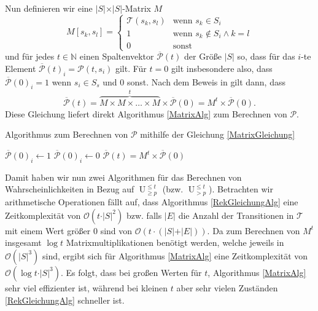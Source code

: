 \documentclass{lni}
\theoremstyle{def_style}
\theoremstyle{break}
\newcommand{\UEqual}[4]{#1\operatorname{U}^{\leq #2}_{\geq #3}#4}
\newcommand{\UStrict}[4]{#1\operatorname{U}^{\leq #2}_{> #3}#4}
\begin{document}
Nun definieren wir eine $\vert S \vert \times \vert S \vert$-Matrix $M$
$$M[s_k,s_l] = \begin{cases}
	\mathcal{T}(s_k,s_l) & \text{wenn } s_k\in S_i \\
	1 & \text{wenn } s_k\notin S_i \land k=l \\
	0 & \text{sonst}
\end{cases}$$
und für jedes $t\in \mathbb{N}$ einen Spaltenvektor $\overline{\mathcal{P}}(t)$ der Größe $\vert S \vert$ so, dass für das $i$-te Element $\overline{\mathcal{P}}(t)_i=\mathcal{P}(t,s_i)$ gilt. 
Für $t=0$ gilt insbesondere also, dass $\overline{\mathcal{P}}(0)_i=1$ wenn $s_i\in S_s$ und $0$ sonst.
Nach dem Beweis in \cite{hansson1994logic} gilt dann, dass 
\begin{equation}
\overline{\mathcal{P}}(t)=\overbrace{M \times M \times \dots \times M}^t \times \overline{\mathcal{P}}(0) = M^t\times \overline{\mathcal{P}}(0).
\label{MatrixGleichung}
\end{equation}
Diese Gleichung liefert direkt Algorithmus \ref{MatrixAlg} zum Berechnen von $\mathcal{P}$. \cite{hansson1994logic}

\begin{algorithm}[h]
	\caption{Algorithmus zum Berechnen von $\mathcal{P}$ mithilfe der Gleichung \ref{MatrixGleichung} \cite{hansson1994logic}}
	\label{MatrixAlg}
	
	\begin{algorithmic}
				\State $\overline{\mathcal{P}}(0)_i \gets 1$
			\Else
				\State $\overline{\mathcal{P}}(0)_i \gets 0$
			\EndIf
		\EndFor
		\State $\overline{\mathcal{P}}(t)=M^t\times \overline{\mathcal{P}}(0)$
	\end{algorithmic}
\end{algorithm}

Damit haben wir nun zwei Algorithmen für das Berechnen von Wahrscheinlichkeiten in Bezug auf $\UEqual{}{t}{p}{}$ (bzw. $\UStrict{}{t}{p}{}$). 
Betrachten wir arithmetische Operationen fällt auf, dass Algorithmus \ref{RekGleichungAlg} eine Zeitkomplexität von $\mathcal{O}(t \cdot \vert S \vert^2)$ bzw. falls $\vert E \vert$ die Anzahl der Transitionen in $\mathcal{T}$ mit einem Wert größer $0$ sind von $\mathcal{O}(t\cdot (\vert S \vert + \vert E \vert))$. 
Da zum Berechnen von $M^t$ insgesamt $\log t$ Matrixmultiplikationen benötigt werden, welche jeweils in $\mathcal{O}(\vert S \vert^3)$ sind, ergibt sich für Algorithmus \ref{MatrixAlg} eine Zeitkomplexität von $\mathcal{O}(\log t \cdot \vert S \vert ^3)$. 
Es folgt, dass bei großen Werten für $t$, Algorithmus \ref{MatrixAlg} sehr viel effizienter ist, während bei kleinen $t$ aber sehr vielen Zuständen \ref{RekGleichungAlg} schneller ist. \cite{hansson1994logic}
\end{document}
